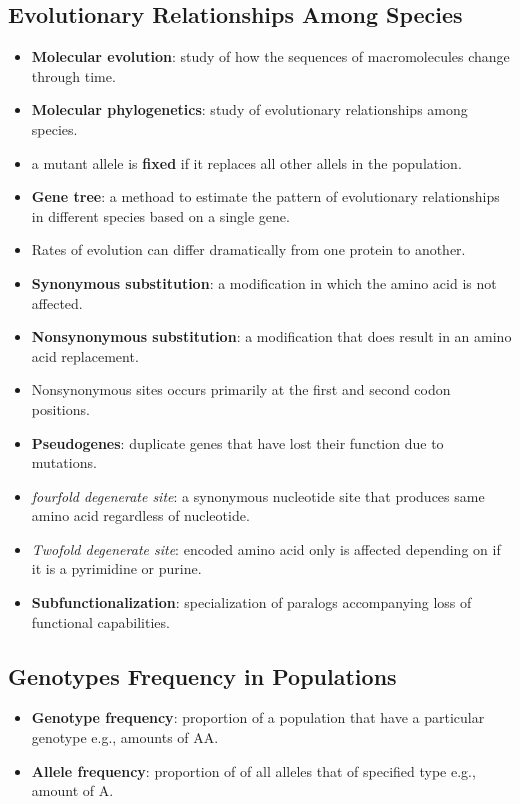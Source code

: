 \documentclass[12pt,a4paper]{article}
\begin{document}
\subsection{Evolutionary Relationships Among Species}
\begin{itemize}
    \item \textbf{Molecular evolution}: study of how the sequences of macromolecules change through time.
    \item \textbf{Molecular phylogenetics}: study of evolutionary relationships among species.
    \item a mutant allele is \textbf{fixed} if it replaces all other allels in the population.
    \item \textbf{Gene tree}: a methoad to estimate the pattern of evolutionary relationships in different species based on a single gene.
    \item Rates of evolution can differ dramatically from one protein to another.
    \item \textbf{Synonymous substitution}: a modification in which the amino acid is not affected.
    \item \textbf{Nonsynonymous substitution}: a modification that does result in an amino acid replacement.
    \item Nonsynonymous sites occurs primarily at the first and second codon positions.
    \item \textbf{Pseudogenes}: duplicate genes that have lost their function due to mutations.
    \item \textit{fourfold degenerate site}: a synonymous nucleotide site that produces same amino acid regardless of nucleotide.
    \item \textit{Twofold degenerate site}: encoded amino acid only is affected depending on if it is a pyrimidine or purine.
    \item \textbf{Subfunctionalization}: specialization of paralogs accompanying loss of functional capabilities.
\end{itemize}

\subsection{Genotypes Frequency in Populations}
\begin{itemize}
    \item \textbf{Genotype frequency}: proportion of a population that have a particular genotype e.g., amounts of AA.
    \item \textbf{Allele frequency}: proportion of of all alleles that of specified type e.g., amount of A.
\end{itemize}
\end{document}
